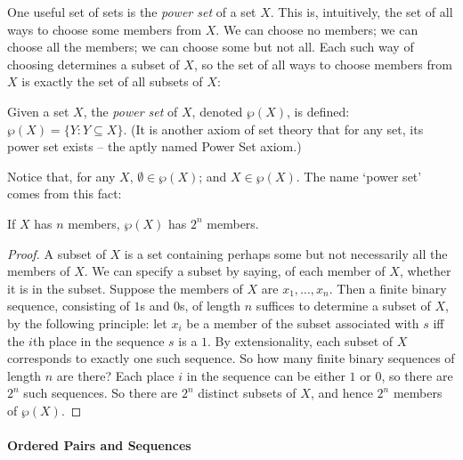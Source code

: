 One useful set of sets is the \emph{power set} of a set $X$. This is, intuitively, the set of all ways to choose some members from $X$. We can choose no members; we can choose all the members; we can choose some but not all. Each such way of choosing determines a subset of $X$, so the set of all ways to choose members from $X$ is exactly the set of all subsets of $X$:
 \begin{definition}Given a set $X$, the \emph{power set} of $X$, denoted $\wp(X)$, is defined: $\wp(X) = \{Y: Y \subseteq X\}$. (It is another axiom of set theory that for any set, its power set exists – the aptly named Power Set axiom.)\end{definition} 
Notice that, for any $X$, $\emptyset \in \wp(X)$; and $X \in \wp(X)$. The name `power set' comes from this fact: 
\begin{theorem} If $X$ has $n$ members, $\wp(X)$ has $2^{n}$ members.
	\begin{proof}
		A subset of $X$ is a set containing perhaps some but not necessarily all the members of $X$. We can specify a subset by saying, of each member of $X$, whether it is in the subset.  Suppose the members of $X$ are $x_{1},\ldots,x_{n}$. Then a finite binary sequence, consisting of $1$s and $0$s, of length $n$ suffices to determine a subset of $X$, by the following principle: let $x_{i}$ be a member of the subset associated with $s$ iff the $i$th place in the sequence $s$ is a $1$. By extensionality, each subset of $X$ corresponds to exactly one such sequence. So how many finite binary sequences of length $n$ are there? Each place $i$ in the sequence can be either $1$ or $0$, so there are $2^{n}$ such sequences. So there are $2^n$ distinct subsets of $X$, and hence $2^{n}$ members of $\wp(X)$. 
	\end{proof}
 \end{theorem}

\paragraph{Ordered Pairs and Sequences}

